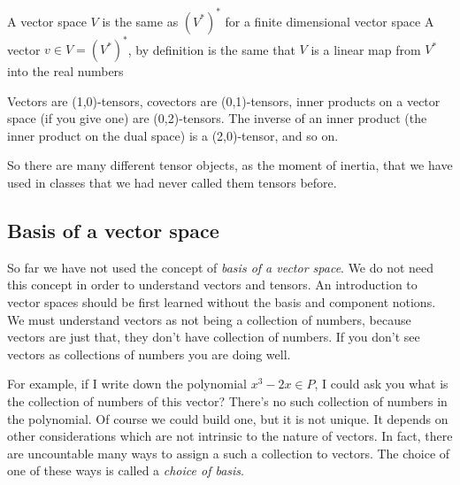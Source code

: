 A vector space $V$ is the same as $(V^\ast)^\ast$ for a finite dimensional vector space\footnotemark{}
A vector $v\in V = (V^\ast)^\ast$, by definition is the same that $V$ is a linear map from $V^\ast$ into
the real numbers
\begin{center}
\end{center}

Vectors are (1,0)-tensors, covectors are (0,1)-tensors,
inner products on a vector space (if you give one) are (0,2)-tensors. The inverse of an
inner product (the inner product on the dual space) is a (2,0)-tensor, and so on.

So there are many different tensor objects, as the moment of inertia, that we have used in classes
that we had never called them tensors before.


\subsection{Basis of a vector space}
So far we have not used the concept of \emph{basis of a vector space}. We do not need this concept
in order to understand vectors and tensors. An introduction to vector spaces should be first
learned without the basis and component notions. We must understand vectors as not being a
collection of numbers, because vectors are just that, they don't have collection of numbers.
If you don't see vectors as collections of numbers you are doing well.

For example, if I write down the polynomial $x^3 - 2x\in P$, I could ask you what is the collection
of numbers of this vector? There's no such collection of numbers in the polynomial.
Of course we could build one, but it is not unique. It depends on other considerations which are
not intrinsic to the nature of vectors. In fact, there are uncountable many ways to assign a such a
collection to vectors. The choice of one of these ways is called a \emph{choice of basis}.

